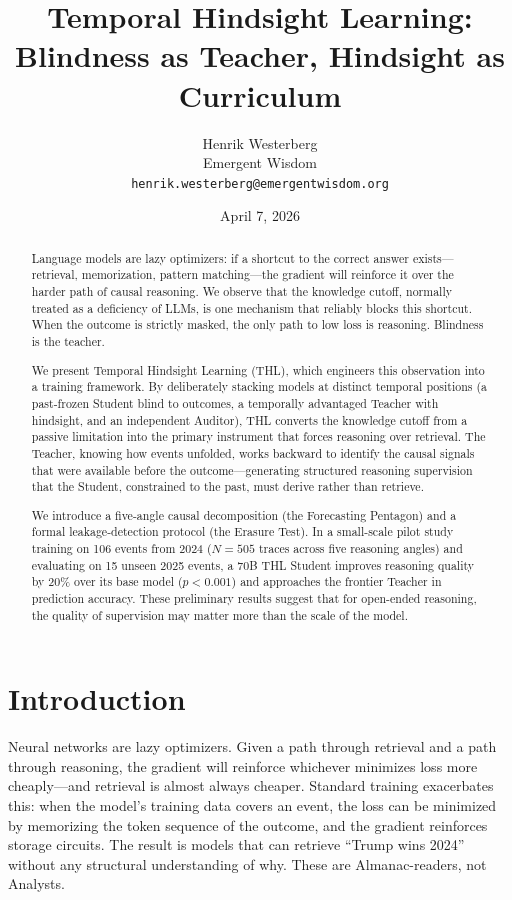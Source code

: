 \documentclass[11pt,a4paper]{article}
\date{April 7, 2026}
\title{Temporal Hindsight Learning:\\[0.3em] Blindness as Teacher, Hindsight as Curriculum}
\author{Henrik Westerberg\\Emergent Wisdom\\\texttt{henrik.westerberg@emergentwisdom.org}}
\begin{document}
\maketitle

\begin{abstract}
Language models are lazy optimizers: if a shortcut to the correct answer exists---retrieval, memorization, pattern matching---the gradient will reinforce it over the harder path of causal reasoning. We observe that the knowledge cutoff, normally treated as a deficiency of LLMs, is one mechanism that reliably blocks this shortcut. When the outcome is strictly masked, the only path to low loss is reasoning. Blindness is the teacher.

We present Temporal Hindsight Learning (THL), which engineers this observation into a training framework. By deliberately stacking models at distinct temporal positions (a past-frozen Student blind to outcomes, a temporally advantaged Teacher with hindsight, and an independent Auditor), THL converts the knowledge cutoff from a passive limitation into the primary instrument that forces reasoning over retrieval. The Teacher, knowing how events unfolded, works backward to identify the causal signals that were available before the outcome---generating structured reasoning supervision that the Student, constrained to the past, must derive rather than retrieve.

We introduce a five-angle causal decomposition (the Forecasting Pentagon) and a formal leakage-detection protocol (the Erasure Test). In a small-scale pilot study training on 106 events from 2024 ($N=505$ traces across five reasoning angles) and evaluating on 15 unseen 2025 events, a 70B THL Student improves reasoning quality by 20\% over its base model ($p < 0.001$) and approaches the frontier Teacher in prediction accuracy. These preliminary results suggest that for open-ended reasoning, the quality of supervision may matter more than the scale of the model.
\end{abstract}

\section{Introduction}

Neural networks are lazy optimizers. Given a path through retrieval and a path through reasoning, the gradient will reinforce whichever minimizes loss more cheaply---and retrieval is almost always cheaper. Standard training exacerbates this: when the model's training data covers an event, the loss can be minimized by memorizing the token sequence of the outcome, and the gradient reinforces storage circuits. The result is models that can retrieve ``Trump wins 2024'' without any structural understanding of why. These are Almanac-readers, not Analysts.
\end{document}
